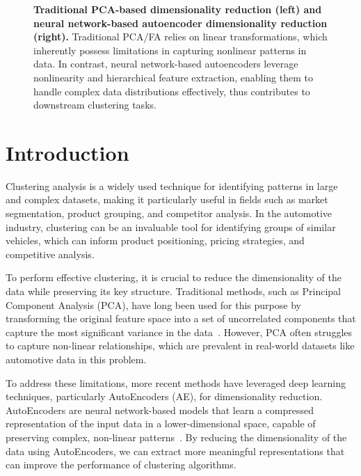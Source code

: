 \documentclass{article} %
\begin{document}
\begin{figure}[!ht]
\begin{subfigure}{.49\textwidth}
       \vspace{-5pt}
       \label{fig:sketch2}
   \end{subfigure}
   \caption{\textbf{Traditional PCA-based dimensionality reduction (left) and neural network-based autoencoder dimensionality reduction (right).} Traditional PCA/FA relies on linear transformations, which inherently possess limitations in capturing nonlinear patterns in data. In contrast, neural network-based autoencoders leverage nonlinearity and hierarchical feature extraction, enabling them to handle complex data distributions effectively, thus contributes to downstream clustering tasks.}
   \label{fig:sketch}
   \vspace{-12pt}
\end{figure}


\section{Introduction}

Clustering analysis is a widely used technique for identifying patterns in large and complex datasets, making it particularly useful in fields such as market segmentation, product grouping, and competitor analysis.
In the automotive industry, clustering can be an invaluable tool for identifying groups of similar vehicles, which can inform product positioning, pricing strategies, and competitive analysis.

To perform effective clustering, it is crucial to reduce the dimensionality of the data while preserving its key structure.
Traditional methods, such as Principal Component Analysis (PCA), have long been used for this purpose by transforming the original feature space into a set of uncorrelated components that capture the most significant variance in the data~\citep{pearson1901pca,hotelling1933pca}.
However, PCA often struggles to capture non-linear relationships, which are prevalent in real-world datasets like automotive data in this problem.

To address these limitations, more recent methods have leveraged deep learning techniques, particularly AutoEncoders (AE), for dimensionality reduction.
AutoEncoders are neural network-based models that learn a compressed representation of the input data in a lower-dimensional space, capable of preserving complex, non-linear patterns~\citep{hinton2006autoencoder,goodfellow2016deep}.
By reducing the dimensionality of the data using AutoEncoders, we can extract more meaningful representations that can improve the performance of clustering algorithms.
\end{document}
